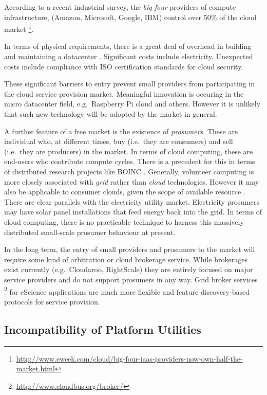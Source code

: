 \documentclass[conference,10pt]{IEEEtran}
\begin{document}
According to a recent industrial survey, the \emph{big four} providers of compute infrastructure, (Amazon, Microsoft, Google, IBM) control over 50\% of the cloud market \footnote{\url{http://www.eweek.com/cloud/big-four-iaas-providers-now-own-half-the-market.html}}.

In terms of physical requirements, there is a great deal of overhead in building and maintaining a datacenter \cite{greenberg08cost}. Significant costs include electricity. Unexpected costs include compliance with ISO certification standards for cloud security.

These significant barriers to entry prevent small providers from participating in the cloud service provision market. Meaningful innovation is occuring in the micro datacenter field, e.g.\ Raspberry Pi cloud and others.
However it is unlikely that such new technology will be adopted by the market in general.


A further feature of a free market is the existence of \emph{prosumers}. These are individual who, at different times,  buy (i.e.\ they are consumers) and sell (i.e.\ they are producers) in the market. In terms of cloud computing, these are end-users who contribute compute cycles. There is a precedent for this in terms of distributed research projects like BOINC \cite{anderson04boinc}.
Generally, volunteer computing is more closely associated with \emph{grid} rather than \emph{cloud} technologies. However it may also be applicable to consumer clouds, given the scope of available resource \cite{anderson06computational}. There are clear parallels with the electricity utility market. Electricity prosumers may have solar panel installations that feed energy back into the grid. In terms of cloud computing, there is no practicable technique to harness this massively distributed small-scale prosumer behaviour at present.

In the long term, the entry of small providers and prosumers to the market will require some kind of arbitration or cloud brokerage service. While brokerages exist currently (e.g.\ Cloudaroo, RightScale) they are entirely focused on major service providers and do not support prosumers in any way.
Grid broker services \footnote{\url{http://www.cloudbus.org/broker/}} for eScience applications are much more flexible and feature discovery-based protocols for service provision. 


\subsection{Incompatibility of Platform Utilities}
\end{document}
